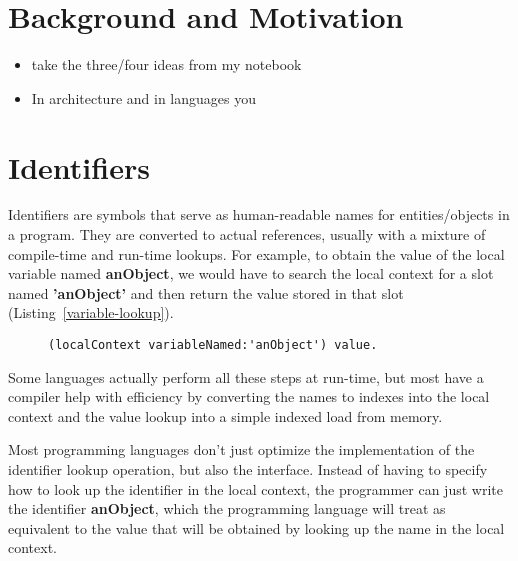 \documentclass[preprint,authoryear]{acm_proc_article-sp}
\begin{document}

\section{Background and Motivation}
\label{background}

\begin{itemize}
\item take the three/four ideas from my notebook
\item In architecture and in languages you
\end{itemize} 




\section{Identifiers}
\label{identifiers}

Identifiers are symbols that serve as human-readable names for entities/objects
in a program.  They are converted to actual references, usually with a mixture of
compile-time and run-time lookups.  For example, to obtain the value of the local
variable named {\bf anObject}, we would have to search the local context for
a slot named {\bf 'anObject'} and then return the value stored in that slot (Listing~\ref{variable-lookup}).


\begin{figure}[htbp]
\begin{lstlisting}[style=L,label=variable-lookup,caption=Lookup of a local variable.]
  (localContext variableNamed:'anObject') value.
\end{lstlisting}
\end{figure}

Some  languages actually perform all these steps at run-time, but most 
have a compiler help with efficiency by converting the names to indexes into
the local context and the value lookup into a simple indexed load from memory.

Most programming languages don't just optimize the implementation of the identifier
lookup operation, but also the interface.  Instead of having to specify how to
look up the identifier in the local context, the programmer can just write the
identifier {\bf anObject}, which the programming language will treat as equivalent to the
value that will be obtained by looking up the name in the local context.  
\end{document}

